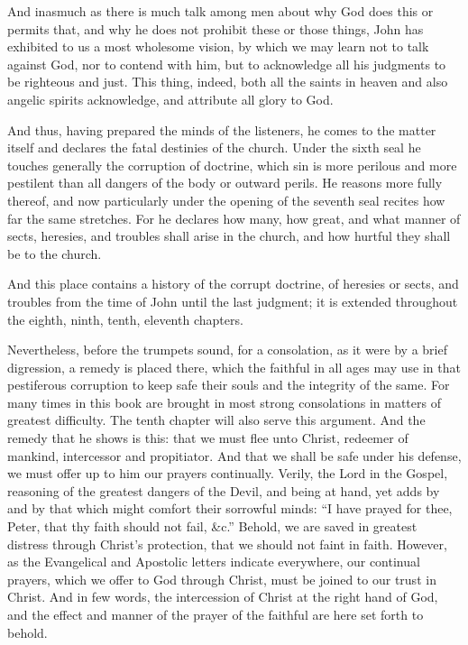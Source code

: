 And inasmuch as there is much talk among men about why God does this or permits that, and why he does not prohibit these or those things, John has exhibited to us a most wholesome vision, by which we may learn not to talk against God, nor to contend with him, but to acknowledge all his judgments to be righteous and just. This thing, indeed, both all the saints in heaven and also angelic spirits acknowledge, and attribute all glory to God.

And thus, having prepared the minds of the listeners, he comes to the matter itself and declares the fatal destinies of the church. Under the sixth seal he touches generally the corruption of doctrine, which sin is more perilous and more pestilent than all dangers of the body or outward perils. He reasons more fully thereof, and now particularly under the opening of the seventh seal recites how far the same stretches. For he declares how many, how great, and what manner of sects, heresies, and troubles shall arise in the church, and how hurtful they shall be to the church.

And this place contains a history of the corrupt doctrine, of heresies or sects, and troubles from the time of John until the last judgment; it is extended throughout the eighth, ninth, tenth, eleventh chapters.

Nevertheless, before the trumpets sound, for a consolation, as it were by a brief digression, a remedy is placed there, which the faithful in all ages may use in that pestiferous corruption to keep safe their souls and the integrity of the same. For many times in this book are brought in most strong consolations in matters of greatest difficulty. The tenth chapter will also serve this argument. And the remedy that he shows is this: that we must flee unto Christ, redeemer of mankind, intercessor and propitiator. And that we shall be safe under his defense, we must offer up to him our prayers continually. Verily, the Lord in the Gospel, reasoning of the greatest dangers of the Devil, and being at hand, yet adds by and by that which might comfort their sorrowful minds: “I have prayed for thee, Peter, that thy faith should not fail, \&c.” Behold, we are saved in greatest distress through Christ’s protection, that we should not faint in faith. However, as the Evangelical and Apostolic letters indicate everywhere, our continual prayers, which we offer to God through Christ, must be joined to our trust in Christ. And in few words, the intercession of Christ at the right hand of God, and the effect and manner of the prayer of the faithful are here set forth to behold.

